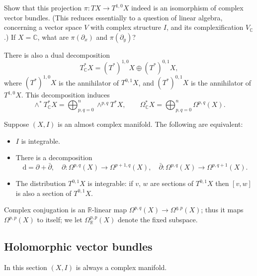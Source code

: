 \documentclass[12pt,letterpaper,reqno]{article}
\numberwithin{equation}{section}
\newcommand{\R}{\ensuremath{\mathbb R}}
\newcommand{\C}{\ensuremath{\mathbb C}}
\newcommand{\de}{\mathrm{d}}
\begin{document}
\begin{exercise}
Show that this projection $\pi: TX \to T^{1,0}X$ indeed is an isomorphism 
of complex vector bundles. (This reduces essentially
to a question of linear algebra, concerning 
a vector space $V$ with complex structure $I$,
and its complexification $V_\C$.) If $X = \C$, 
what are $\pi(\partial_x)$ and $\pi(\partial_y)$?
\end{exercise}

There is also a dual decomposition
\begin{equation}
T^*_\C X = (T^*)^{1,0} X \oplus (T^*)^{0,1} X,
  \end{equation}
where $(T^*)^{1,0} X$ is the annihilator of
$T^{0,1} X$, and $(T^*)^{0,1} X$ is the annihilator of
$T^{1,0} X$.
This decomposition induces
\begin{equation}
\wedge^* T^*_\C X = \bigoplus_{p,q=0}^n \wedge^{p,q} T^* X , \qquad \Omega^*_\C X = \bigoplus_{p,q=0}^n \Omega^{p,q}(X).
\end{equation}

\begin{prop} \label{prop:integrability}
Suppose $(X,I)$ is an almost complex manifold. The following are equivalent:
\begin{itemize}
\item $I$ is integrable.
\item There is a decomposition
\begin{equation}
\de = \partial + \bar\partial, \quad \partial: \Omega^{p,q}(X) \to \Omega^{p+1,q}(X), \quad \bar\partial: \Omega^{p,q}(X) \to \Omega^{p,q+1}(X).
\end{equation}
\item The distribution $T^{0,1}X$ is integrable: if $v$, $w$ are 
sections of $T^{0,1}X$ then $[v,w]$ is also a section of $T^{0,1}X$.
\end{itemize}
\end{prop}

Complex conjugation is an $\R$-linear map
$\Omega^{p,q}(X) \to \Omega^{q,p}(X)$;
thus it maps $\Omega^{p,p}(X)$ to itself;
we let $\Omega_\R^{p,p}(X)$ denote the fixed subspace.

\subsection{Holomorphic vector bundles}

In this section $(X,I)$ is always a complex manifold.
\end{document}
